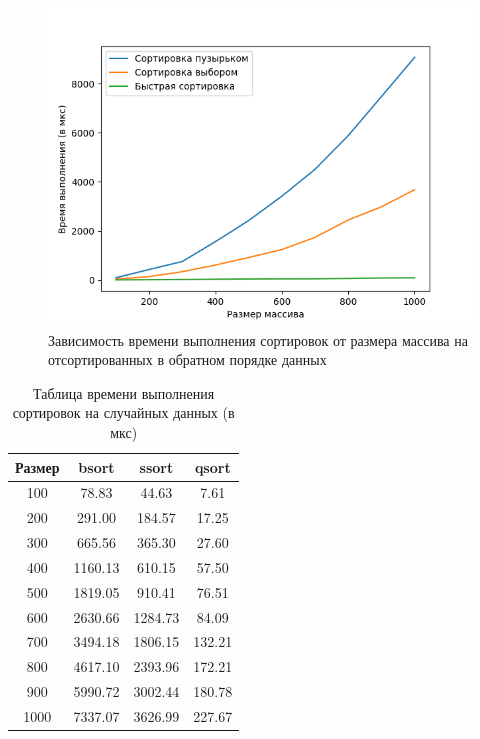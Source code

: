 \documentclass[12pt]{report}
\begin{document}
\begin{figure}[H]
	\centering
	\includegraphics[scale = 0.8]{undir.png}
	\caption{Зависимость времени выполнения сортировок от размера массива на отсортированных в обратном порядке данных}
	\label{fig:mpr2}
\end{figure}

\begin{table} [H]
	\caption{Таблица времени выполнения сортировок на случайных данных (в мкс)}
	\label{t3}
	\begin{center}
	\begin{tabular}{|c c c c|}
		\hline
		Размер & bsort & ssort  & qsort \\ [0.5ex]
		\hline
100 & 78.83 & 44.63 & 7.61  \\ 
\hline
200 & 291.00 & 184.57 & 17.25  \\ 
\hline
300 & 665.56 & 365.30 & 27.60 \\ 
\hline
400 & 1160.13 & 610.15 & 57.50  \\ 
\hline
500 & 1819.05 & 910.41 & 76.51  \\ 
\hline
600 & 2630.66 & 1284.73 & 84.09  \\ 
\hline
700 & 3494.18 & 1806.15 & 132.21  \\ 
\hline
800 & 4617.10 & 2393.96 & 172.21  \\ 
\hline
900 & 5990.72 & 3002.44 & 180.78 \\
\hline
1000 & 7337.07 & 3626.99 & 227.67 \\
\hline

	\end{tabular}
	\end{center}
\end{table}
\end{document}
